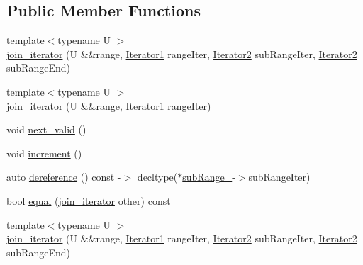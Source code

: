 \subsection*{Public Member Functions}
\begin{DoxyCompactItemize}
\item 
{\footnotesize template$<$typename U $>$ }\\\mbox{\hyperlink{structrah_1_1view_1_1join__iterator_a5a30ddd6e3809e32be7d6dc723c4afe5}{join\+\_\+iterator}} (U \&\&range, \mbox{\hyperlink{structrah_1_1view_1_1join__iterator_a8b71c6f25eee2915e2a8afc6e024196d}{Iterator1}} range\+Iter, \mbox{\hyperlink{structrah_1_1view_1_1join__iterator_ae03a066174f3422c70d0e3c22e68d9f7}{Iterator2}} sub\+Range\+Iter, \mbox{\hyperlink{structrah_1_1view_1_1join__iterator_ae03a066174f3422c70d0e3c22e68d9f7}{Iterator2}} sub\+Range\+End)
\item 
{\footnotesize template$<$typename U $>$ }\\\mbox{\hyperlink{structrah_1_1view_1_1join__iterator_a2ba7e5d1fd1ea1e786ca894fe96ffeb4}{join\+\_\+iterator}} (U \&\&range, \mbox{\hyperlink{structrah_1_1view_1_1join__iterator_a8b71c6f25eee2915e2a8afc6e024196d}{Iterator1}} range\+Iter)
\item 
void \mbox{\hyperlink{structrah_1_1view_1_1join__iterator_a6b3ef13305f87d011e2fecdb28b5dec6}{next\+\_\+valid}} ()
\item 
void \mbox{\hyperlink{structrah_1_1view_1_1join__iterator_a4f81464b6ff2707bb21d2bbd409c4f4d}{increment}} ()
\item 
auto \mbox{\hyperlink{structrah_1_1view_1_1join__iterator_ac7bc0fcd91d164f86d5813421a08d38a}{dereference}} () const -\/$>$ decltype($\ast$\mbox{\hyperlink{structrah_1_1view_1_1join__iterator_ae9351284af0f64c368606315da0b56a5}{sub\+Range\+\_\+}}-\/$>$sub\+Range\+Iter)
\item 
bool \mbox{\hyperlink{structrah_1_1view_1_1join__iterator_a76c4e51e7c191e189e01d15eff2b7055}{equal}} (\mbox{\hyperlink{structrah_1_1view_1_1join__iterator}{join\+\_\+iterator}} other) const
\item 
{\footnotesize template$<$typename U $>$ }\\\mbox{\hyperlink{structrah_1_1view_1_1join__iterator_a5a30ddd6e3809e32be7d6dc723c4afe5}{join\+\_\+iterator}} (U \&\&range, \mbox{\hyperlink{structrah_1_1view_1_1join__iterator_a8b71c6f25eee2915e2a8afc6e024196d}{Iterator1}} range\+Iter, \mbox{\hyperlink{structrah_1_1view_1_1join__iterator_ae03a066174f3422c70d0e3c22e68d9f7}{Iterator2}} sub\+Range\+Iter, \mbox{\hyperlink{structrah_1_1view_1_1join__iterator_ae03a066174f3422c70d0e3c22e68d9f7}{Iterator2}} sub\+Range\+End)

\end{DoxyCompactItemize}
